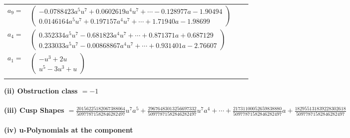 \documentclass[1p]{elsarticle_modified}
\theoremstyle{definition}
\begin{document}
\begin{tabular}{m{7pt} m{180pt} m{7pt} m{180pt} }
\flushright $a_{9}=$&$\begin{pmatrix}-0.0788423 a^{5} u^{7}+0.0602619 a^{4} u^{7}+\cdots-0.128977 a-1.90494\\0.0146164 a^{5} u^{7}+0.197157 a^{4} u^{7}+\cdots+1.71940 a-1.98699\end{pmatrix}$ \\
\flushright $a_{4}=$&$\begin{pmatrix}0.352334 a^{5} u^{7}-0.681823 a^{4} u^{7}+\cdots+0.871371 a+0.687129\\0.233033 a^{5} u^{7}-0.00868867 a^{4} u^{7}+\cdots+0.931401 a-2.76607\end{pmatrix}$ \\
\flushright $a_{1}=$&$\begin{pmatrix}- u^3+2 u\\u^5-3 u^3+u\end{pmatrix}$\\&\end{tabular}
\flushleft \textbf{(ii) Obstruction class $= -1$}\\~\\
\flushleft \textbf{(iii) Cusp Shapes $= \frac{20156225182067388064}{50977871582846282497} u^7 a^5+\frac{29676483013256697332}{50977871582846282497} u^7 a^4+\cdots+\frac{21731100052659838880}{50977871582846282497} a+\frac{182955131839228302618}{50977871582846282497}$}\\~\\
\newpage\renewcommand{\arraystretch}{1}
\flushleft \textbf{(iv) u-Polynomials at the component}\newline \\
\end{document}
